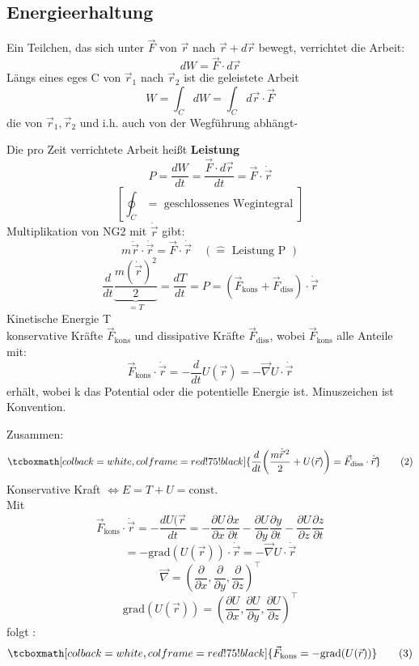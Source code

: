 \documentclass[titlepage,12pt,a4paper,ngerman]{report}
\newcommand{\tx}[1]{\textrm{#1}}
\newcommand{\ub}[1]{\underbrace{#1}}
\newcommand{\grad}{\tx{grad}}
\newcommand{\rmbox}[1]{\tcboxmath[colback=white,colframe=red!75!black]{#1}} %
\renewcommand{\boxed}{\rmbox}
\begin{document}
\subsection{Energieerhaltung}
Ein Teilchen, das sich unter $\vec{F}$ von $\vec{r}$ nach $\vec{r} + d\vec{r}$ bewegt, verrichtet die Arbeit:
$$ dW = \vec{F} \cdot d \vec{r}$$
Längs eines eges C von $\vec{r}_{1}$ nach $\vec{r}_{2}$ ist die geleistete Arbeit
$$W = \int_C dW = \int_C d\vec{r}\cdot \vec{F}$$
die von $\vec{r}_1, \vec{r}_2$ und i.h. auch von der Wegführung abhängt-\par
Die pro Zeit verrichtete Arbeit heißt \textbf{Leistung} 
$$ P = \frac{dW}{dt} = \frac{\vec{F}\cdot d \vec{r}}{dt} = \vec{F}\cdot \dot{\vec{r}}$$
$$[\oint_C = \textrm{ geschlossenes Wegintegral }]$$
Multiplikation von NG2 mit $\dot{\vec{r}}$ gibt:
$$ m\ddot{\vec{r}} \cdot \dot{\vec{r}} =\vec{F} \cdot \dot{\vec{r}} \quad ( \widehat{=} \tx{ Leistung P })$$
$$\frac{d}{dt} \ub{\frac{m(\dot{\vec{r}})^2}{2}}_{=T} = \frac{dT}{dt} = P = (\vec{F}_{\tx{kons}} + \vec{F}_{\tx{diss}}) \cdot \dot{\vec{r}} $$
Kinetische Energie T\\
konservative Kräfte $\vec{F}_{\tx{kons}}$ und dissipative Kräfte $\vec{F}_{\tx{diss}}$, wobei $\vec{F}_{\tx{kons}}$ alle Anteile mit:
$$\vec{F}_{\tx{kons}} \cdot \dot{\vec{r}} = - \frac{d}{dt} U(\vec{r}) = - \vec{\nabla} U \cdot \dot{\vec{r}}$$
erhält, wobei k das Potential oder die potentielle Energie ist.
Minuszeichen ist Konvention.\par
Zusammen:
\begin{equation*}
\boxed{\frac{d}{dt} \bigg( \frac{m \dot{\vec{r}}^{\,2}}{2} + U(\vec{r})\bigg)= \vec{F}_{\tx{diss}}
	\cdot \dot{\vec{r}}} \tag{2}
\end{equation*}
Konservative Kraft $\Leftrightarrow E = T+U=\tx{const.}$\\
Mit 
$$ \vec{F}_{\tx{kons}} \cdot \dot{\vec{r}} = - \frac{dU(\vec{r}}{dt} = -\frac{\partial U}{\partial x}\frac{\partial x}{\partial t} - \frac{\partial U}{\partial y}\frac{\partial y }{\partial t} - \frac{\partial U}{\partial z} \frac{\partial z }{\partial t}$$
$$ = - \grad(U(\vec{r})) \cdot  \dot{\vec{r}} = - \vec{\nabla} U \cdot \dot{\vec{r}}$$
$$ \vec{\nabla} = ( \frac{\partial }{\partial x}, \frac{\partial }{\partial y}, \frac{\partial }{\partial z}) ^\top$$
$$ \grad(U(\vec{r})) = ( \frac{\partial U}{\partial x}, \frac{\partial U}{\partial y}, \frac{\partial U}{\partial z}) ^\top$$
folgt :
\begin{equation*}
\boxed{\vec{F}_{\tx{kons}} = - \grad(U(\vec{r}))} \tag{3}
\end{equation*}
\end{document}
